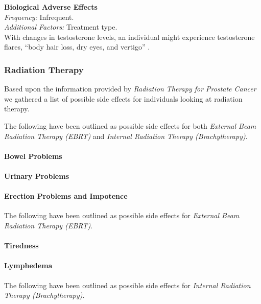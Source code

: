 \documentclass[journal]{vgtc}                %
\begin{document}
                        \textbf{Biological Adverse Effects}
                        \\ \textit{Frequency:} Infrequent.
                        \\ \textit{Additional Factors:} Treatment type.
                        \\ With changes in testosterone levels, an individual might experience testosterone flares, ``body hair loss, dry eyes, and vertigo'' \cite{AdverseEvents:2005}.


                \subsubsection{Radiation Therapy}
                        Based upon the information provided by \textit{Radiation Therapy for Prostate Cancer}\cite{RadiationTherapy:2005} we gathered a list of possible side effects for individuals looking at radiation therapy.

                        The following have been outlined as possible side effects for both \textit{External Beam Radiation Therapy (EBRT)} and \textit{Internal Radiation Therapy (Brachytherapy)}.
                        \paragraph{Bowel Problems}
                        \paragraph{Urinary Problems}
                        \paragraph{Erection Problems and Impotence}

                        The following have been outlined as possible side effects for \textit{External Beam Radiation Therapy (EBRT)}.
                        \paragraph{Tiredness}
                        \paragraph{Lymphedema}

                        The following have been outlined as possible side effects for \textit{Internal Radiation Therapy (Brachytherapy)}.
\end{document}
